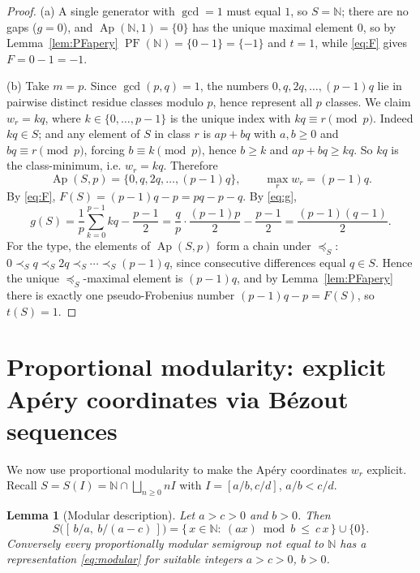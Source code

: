 \documentclass{amsart}
\newtheorem{lemma}{Lemma}
\theoremstyle{definition}
\DeclareMathOperator{\Ap}{Ap}
\DeclareMathOperator{\PF}{PF}
\newcommand{\NN}{\mathbb{N}}
\begin{document}
\begin{proof}
(a) A single generator with $\gcd=1$ must equal $1$, so $S=\NN$; there are
no gaps ($g=0$), and $\Ap(\NN,1)=\{0\}$ has the unique maximal element $0$,
so by Lemma~\ref{lem:PFapery} $\PF(\NN)=\{0-1\}=\{-1\}$ and $t=1$, while
\eqref{eq:F} gives $F=0-1=-1$.

(b) Take $m=p$. Since $\gcd(p,q)=1$, the numbers $0,q,2q,\dots,(p-1)q$ lie
in pairwise distinct residue classes modulo $p$, hence represent all $p$
classes. We claim $w_r=kq$, where $k\in\{0,\dots,p-1\}$ is the unique index
with $kq\equiv r\pmod p$. Indeed $kq\in S$; and any element of $S$ in class
$r$ is $ap+bq$ with $a,b\ge0$ and $bq\equiv r\pmod p$, forcing
$b\equiv k\pmod p$, hence $b\ge k$ and $ap+bq\ge kq$. So $kq$ is the
class-minimum, i.e. $w_r=kq$. Therefore
\[
\Ap(S,p)=\{0,q,2q,\dots,(p-1)q\},\qquad \max_r w_r=(p-1)q.
\]
By \eqref{eq:F}, $F(S)=(p-1)q-p=pq-p-q$. By \eqref{eq:g},
\[
g(S)=\frac1p\sum_{k=0}^{p-1}kq-\frac{p-1}{2}
=\frac{q}{p}\cdot\frac{(p-1)p}{2}-\frac{p-1}{2}
=\frac{(p-1)(q-1)}{2}.
\]
For the type, the elements of $\Ap(S,p)$ form a chain under $\preceq_S$:
$0\prec_S q\prec_S 2q\prec_S\cdots\prec_S (p-1)q$, since consecutive
differences equal $q\in S$. Hence the unique $\preceq_S$-maximal element is
$(p-1)q$, and by Lemma~\ref{lem:PFapery} there is exactly one
pseudo-Frobenius number $(p-1)q-p=F(S)$, so $t(S)=1$.
\end{proof}

\section{Proportional modularity: explicit Ap\'ery coordinates via B\'ezout
sequences}

We now use proportional modularity to make the Ap\'ery coordinates $w_r$
explicit. Recall $S=S(I)=\NN\cap\bigsqcup_{n\ge0}nI$ with $I=[a/b,c/d]$,
$a/b<c/d$.

\begin{lemma}[Modular description]\label{lem:moddesc}
Let $a>c>0$ and $b>0$. Then
\begin{equation}\label{eq:modular}
S\bigl([\,b/a,\ b/(a-c)\,]\bigr)
=\{\,x\in\NN:\ (a x)\bmod b\ \le\ c\,x\,\}\cup\{0\}.
\end{equation}
Conversely every proportionally modular semigroup not equal to $\NN$ has a
representation \eqref{eq:modular} for suitable integers $a>c>0$, $b>0$.
\end{lemma}
\end{document}
